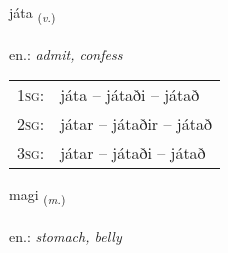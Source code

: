 \documentclass[frontgrid, backgrid]{flacards}\usepackage[]{graphicx}\usepackage[]{xcolor}
\begin{document}
\renewcommand{\flhead}{\vskip5pt \fboxsep=0pt {\small\bfseries\footnotesize Sagnorð | Verb}}
\renewcommand{\fcfoot}{\vskip5pt \fboxsep=0pt \hspace{2pt}{\small\bfseries\footnotesize 2K}}

\renewcommand{\blhead}{\vskip5pt {\small\bfseries\footnotesize Sagnorð | Verb }}
\renewcommand{\bcfoot}{\vskip5pt \hspace{2pt}{\small\bfseries\footnotesize 2K}}


{játa \small{\textsubscript{(\textit{v.})}} \\[1ex] %
\textphonetic{[jauːta]} \\
en.: \emph{admit, confess} \\  [2ex]
\renewcommand*{\arraystretch}{0.8}
\begin{tabular}{p{1cm}l}
\textsc{1sg}: & játa -- játaði -- játað \\ 
\textsc{2sg}: & játar -- játaðir -- játað \\ 
\textsc{3sg}: & játar -- játaði -- játað \\ 
\end{tabular}
}

\renewcommand{\flhead}{\vskip5pt \fboxsep=0pt {\small\bfseries\footnotesize Nafnorð | Noun}}
\renewcommand{\fcfoot}{\vskip5pt \fboxsep=0pt \hspace{2pt}{\small\bfseries\footnotesize 2K}}

\renewcommand{\blhead}{\vskip5pt {\small\bfseries\footnotesize Nafnorð | Noun }}
\renewcommand{\bcfoot}{\vskip5pt \hspace{2pt}{\small\bfseries\footnotesize 2K}}


{magi \small{\textsubscript{(\textit{m.})}} \\[1ex] %
\textphonetic{[maijɪ]} \\
en.: \emph{stomach, belly} \\  [2ex]
\renewcommand*{\arraystretch}{0.8}
}
\end{document}

